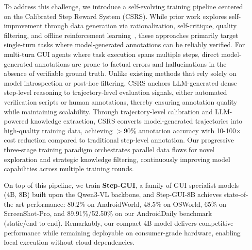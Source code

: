To address this challenge, we introduce a self-evolving training pipeline centered on the Calibrated Step Reward System (CSRS). While prior work explores self-improvement through data generation via rationalization, self-critique, quality filtering, and offline reinforcement learning~\cite{zelikman2022star, madaan2023self_selfrefine, jung2023impossibledistill, gulcehre2023reinforced_rest}, these approaches primarily target single-turn tasks where model-generated annotations can be reliably verified. 
For multi-turn GUI agents where task execution spans multiple steps, direct model-generated annotations are prone to factual errors and hallucinations in the absence of verifiable ground truth. 
Unlike existing methods that rely solely on model introspection or post-hoc filtering, CSRS anchors LLM-generated dense step-level reasoning to trajectory-level evaluation signals, either automated verification scripts or human annotations, thereby ensuring annotation quality while maintaining scalability. 
Through trajectory-level calibration and LLM-powered knowledge extraction, CSRS converts model-generated trajectories into high-quality training data, achieving $>$90\% annotation accuracy with 10-100$\times$ cost reduction compared to traditional step-level annotation. Our progressive three-stage training paradigm orchestrates parallel data flows for novel exploration and strategic knowledge filtering, continuously improving model capabilities across multiple training rounds. 

On top of this pipeline, we train \textbf{Step-GUI}, a family of GUI specialist models (4B, 8B) built upon the Qwen3-VL backbone, and Step-GUI-8B achieves state-of-the-art performance: 80.2\% on AndroidWorld, 48.5\% on OSWorld, 65\% on ScreenShot-Pro, and 89.91\%/52.50\% on our AndroidDaily benchmark (static/end-to-end). Remarkably, our compact 4B model delivers competitive performance while remaining deployable on consumer-grade hardware, enabling local execution without cloud dependencies.

